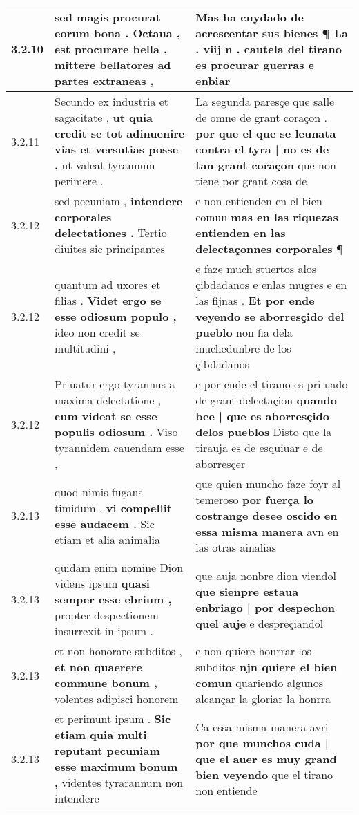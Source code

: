 \begin{tabular}{|p{1cm}|p{6.5cm}|p{6.5cm}|}
3.2.10 & sed magis procurat eorum bona . \textbf{ Octaua , est procurare bella , } mittere bellatores ad partes extraneas , & Mas ha cuydado de acrescentar sus bienes \textbf{ ¶ La . viij n . cautela del tirano } es procurar guerras e enbiar \\\hline
3.2.11 & Secundo ex industria et sagacitate , \textbf{ ut quia credit se tot adinuenire vias et versutias posse , } ut valeat tyrannum perimere . & La segunda paresçe que salle de omne de grant coraçon . \textbf{ por que el que se leunata contra el tyra | no es de tan grant coraçon } que non tiene por grant cosa de \\\hline
3.2.12 & sed pecuniam , \textbf{ intendere corporales delectationes . } Tertio diuites sic principantes & e non entienden en el bien comun \textbf{ mas en las riquezas entienden en las delectaçonnes corporales } ¶ \\\hline
3.2.12 & quantum ad uxores et filias . \textbf{ Videt ergo se esse odiosum populo , } ideo non credit se multitudini , & e faze much stuertos alos çibdadanos e enlas mugres e en las fijnas . \textbf{ Et por ende veyendo se aborresçido del pueblo } non fia dela muchedunbre de los çibdadanos \\\hline
3.2.12 & Priuatur ergo tyrannus a maxima delectatione , \textbf{ cum videat se esse populis odiosum . } Viso tyrannidem cauendam esse , & e por ende el tirano es pri uado de grant delectaçion \textbf{ quando bee | que es aborresçido delos pueblos } Disto que la tirauja es de esquiuar e de aborresçer \\\hline
3.2.13 & quod nimis fugans timidum , \textbf{ vi compellit esse audacem . } Sic etiam et alia animalia & que quien muncho faze foyr al temeroso \textbf{ por fuerça lo costrange desee oscido en essa misma manera } avn en las otras ainalias \\\hline
3.2.13 & quidam enim nomine Dion videns ipsum \textbf{ quasi semper esse ebrium , } propter despectionem insurrexit in ipsum . & que auja nonbre dion viendol \textbf{ que sienpre estaua enbriago | por despechon quel auje } e despreçiandol \\\hline
3.2.13 & et non honorare subditos , \textbf{ et non quaerere commune bonum , } volentes adipisci honorem & e non quiere honrrar los subditos \textbf{ njn quiere el bien comun } quariendo algunos alcançar la gloriar la honrra \\\hline
3.2.13 & et perimunt ipsum . \textbf{ Sic etiam quia multi reputant pecuniam esse maximum bonum , } videntes tyrarannum non intendere & Ca essa misma manera avri \textbf{ por que munchos cuda | que el auer es muy grand bien veyendo } que el tirano non entiende \\\hline

\end{tabular}
